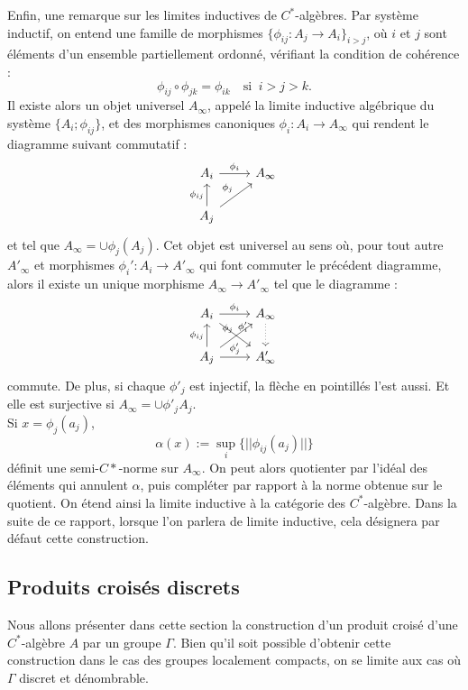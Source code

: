 Enfin, une remarque sur les limites inductives de $C^*$-algèbres. Par système inductif, on entend une famille de morphismes $\{\phi_{ij}:A_j\rightarrow A_i\}_{i>j}$, où $i$ et $j$ sont éléments d'un ensemble partiellement ordonné, vérifiant la condition de cohérence :
\[\phi_{ij}\circ\phi_{jk}=\phi_{ik}\quad \text{si }\ i>j>k.\]
Il existe alors un objet universel $A_\infty$, appelé la limite inductive algébrique du système $\{A_i; \phi_{ij}\}$, et des morphismes canoniques $\phi_i : A_i \rightarrow A_\infty$ qui rendent le diagramme suivant commutatif :
\[\begin{tikzcd} A_i \arrow{r}{\phi_i} & A_\infty \\
			A_j \arrow{ur}{\phi_j}\arrow{u}{\phi_{ij}} & 
\end{tikzcd}\]
et tel que $A_\infty = \cup \phi_j(A_j)$. Cet objet est universel au sens où, pour tout autre $A'_\infty$ et morphismes $\phi_i' : A_i\rightarrow A'_\infty$ qui font commuter le précédent diagramme, alors il existe un unique morphisme $A_\infty \rightarrow A'_\infty$ tel que le diagramme :
\[\begin{tikzcd}A_i \arrow{r}{\phi_i}\arrow{dr}{\phi'_i}& A_\infty\arrow[dotted]{d} \\
		    A_j \arrow{u}{\phi_{ij}}\arrow{ur}{\phi_j}\arrow{r}{\phi'_j}& A'_\infty
\end{tikzcd}\] 
commute. De plus, si chaque $\phi'_j$ est injectif, la flèche en pointillés l'est aussi. Et elle est surjective si $A_\infty= \cup \phi'_j A_j$. \\

Si $x=\phi_j(a_j)$,
\[\alpha(x):=\sup_i\{||\phi_{ij}(a_j)||\}\]
définit une semi-$C*$-norme sur $A_\infty$. On peut alors quotienter par l'idéal des éléments qui annulent $\alpha$, puis compléter par rapport à la norme obtenue sur le quotient. On étend ainsi la limite inductive à la catégorie des $C^*$-algèbre. Dans la suite de ce rapport, lorsque l'on parlera de limite inductive, cela désignera par défaut cette construction.

\subsection{Produits croisés discrets}

Nous allons présenter dans cette section la construction d'un produit croisé d'une $C^*$-algèbre $A$ par un groupe $\Gamma$. Bien qu'il soit possible d'obtenir cette construction dans le cas des groupes localement compacts, on se limite aux cas où $\Gamma$ discret et dénombrable.\\

